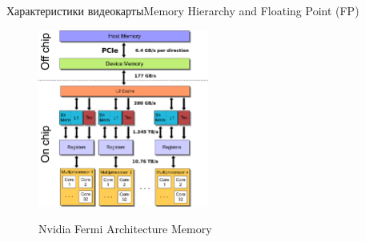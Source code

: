 \documentclass{beamer}
\begin{document}
\begin{frame}{ Характеристики видеокарты}{Memory Hierarchy and Floating Point (FP)}
	\begin{figure}
		\href{https://www.researchgate.net/profile/M-Clark/publication/51927898/figure/fig4/AS:668607537233921@1536419867027/A-schematic-of-the-memory-hierarchy-of-the-Nvidia-Fermi-architecture-with-the-peak.png}{
			\includegraphics[width=0.5\textwidth]{images/Nvidia_Fermi_architecture_memory.png}}
		\caption {Nvidia Fermi Architecture Memory}
	\end{figure}
	
\end{frame}
\end{document}
